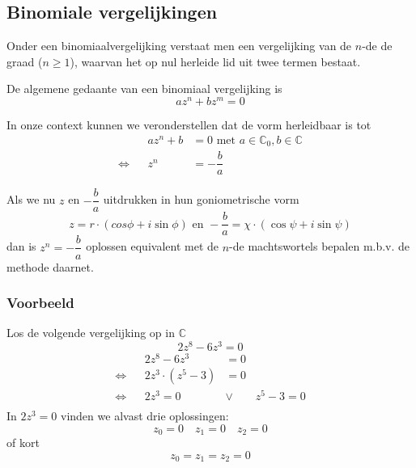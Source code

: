 \documentclass[12pt,twoside,a4paper]{article}
\begin{document}
\subsection{Binomiale vergelijkingen}

Onder een binomiaalvergelijking verstaat men een vergelijking van de $n$-de de graad ($n \geq 1$), waarvan het op nul herleide lid uit twee termen bestaat.

De algemene gedaante van een binomiaal vergelijking is
\[az^n + bz^m=0\]

In onze context kunnen we veronderstellen dat de vorm herleidbaar is tot
\begin{align*}
     && az^n+b &= 0 \text{ met } a\in\mathbb{C}_0, b\in\mathbb{C}\\
  \Leftrightarrow &&    z^n  &= -\dfrac{b}{a}
\end{align*}

Als we nu $z$ en $-\dfrac{b}{a}$ uitdrukken in hun goniometrische vorm
\[z=r\cdot(cos\phi + i\sin\phi) \text{ en } -\dfrac{b}{a}=\chi \cdot ( \cos\psi + i\sin\psi )\]
dan is $z^n=-\dfrac{b}{a}$ oplossen equivalent met de $n$-de machtswortels bepalen m.b.v. de methode daarnet.

\subsubsection*{Voorbeeld}

Los de volgende vergelijking op in $\mathbb{C}$
\[2z^8-6z^3=0\]
\begin{align*}
     && 2z^8-6z^3 &= 0\\
  \Leftrightarrow && 2z^3 \cdot (z^5 - 3) &= 0\\
  \Leftrightarrow && 2z^3 = 0 \qquad &\vee \qquad z^5 - 3 = 0\\
\end{align*}
In $2z^3 = 0$ vinden we alvast drie oplossingen:
\[z_0 = 0 \quad z_1 = 0 \quad z_2 = 0\]
of kort
\[z_0 = z_1 = z_2 = 0\]
\end{document}
